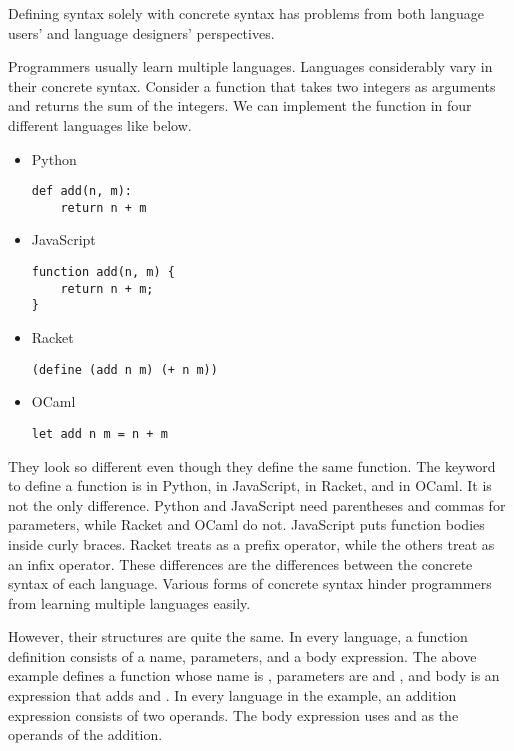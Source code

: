 Defining syntax solely with concrete syntax has problems from both language
users' and language designers' perspectives.

Programmers usually learn multiple languages. Languages considerably vary in their concrete
syntax. Consider a function that takes two integers as arguments and
returns the sum of the integers. We can implement the function in four different
languages like below.

\begin{itemize}
  \item Python

\begin{verbatim}
def add(n, m):
    return n + m
\end{verbatim}

  \item JavaScript

\begin{verbatim}
function add(n, m) {
    return n + m;
}
\end{verbatim}

  \item Racket

\begin{verbatim}
(define (add n m) (+ n m))
\end{verbatim}

  \item OCaml

\begin{verbatim}
let add n m = n + m
\end{verbatim}
\end{itemize}

They look so different even though they define the same function. The
keyword to define a function is  in Python,  in
JavaScript,  in Racket, and  in OCaml. It is not
the only difference. Python and JavaScript need parentheses and commas
for parameters, while Racket and OCaml do not. JavaScript puts function
bodies inside curly braces. Racket treats \code{+} as a prefix operator,
while the others treat \code{+} as an infix operator. These differences
are the differences between the concrete syntax of each language.
Various forms of concrete syntax hinder programmers from learning
multiple languages easily.

However, their structures are quite the same. In every language, a
function definition consists of a name, parameters, and a body
expression. The above example defines a function whose name is ,
parameters are  and , and body is an expression that
adds  and . In every language in the example, an addition expression
consists of two operands. The body expression uses  and 
as the operands of the addition.

